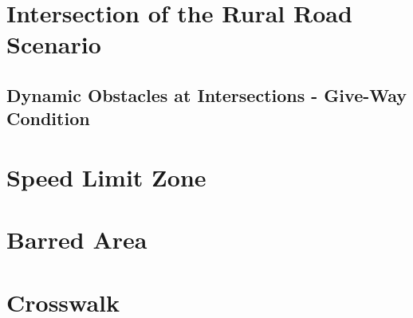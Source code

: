 \section{Intersection of the Rural Road Scenario}
\label{fig_intersection_rural}
\begin{figure}[H]
	\begin{center}
		\centering
	\end{center}
\end{figure}

\subsection{Dynamic Obstacles at Intersections - Give-Way Condition}
\label{fig_intersection_give_way}
\begin{figure}[H]
	\begin{center}
		\centering
	\end{center}
\end{figure}

\section{Speed Limit Zone}
\label{fig_speed_limit_zone}
\begin{figure}[H]
	\begin{center}
		\centering
	\end{center}
\end{figure}

\section{Barred Area}
\label{fig_barred_area}
\begin{figure}[H]
	\begin{center}
		\centering
	\end{center}
\end{figure}

\section{Crosswalk}
\label{fig_crosswalk}
\begin{figure}[H]
	\begin{center}
		\centering
	\end{center}
\end{figure}
\newpage

